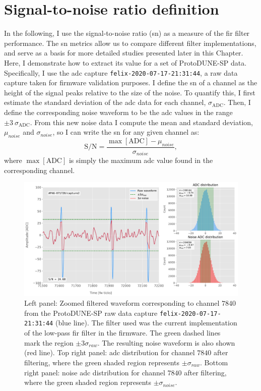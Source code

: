 \section{Signal-to-noise ratio definition}
\label{sec:matched_filter_sn_definition}

In the following, I use the signal-to-noise ratio (\gls{sn}) as a measure of the \gls{fir} filter performance. The \gls{sn} metrics allow us to compare different filter implementations, and serve as a basis for more detailed studies presented later in this Chapter. Here, I demonstrate how to extract its value for a set of ProtoDUNE-SP data. Specifically, I use the \gls{adc} capture \texttt{felix-2020-07-17-21:31:44}, a raw data capture taken for firmware validation purposes. I define the \gls{sn} of a channel as the height of the signal peaks relative to the size of the noise. To quantify this, I first estimate the standard deviation of the \gls{adc} data for each channel, $\sigma_{\mathrm{ADC}}$. Then, I define the corresponding noise waveform to be the \gls{adc} values in the range $\pm 3~\sigma_{\mathrm{ADC}}$. From this new noise data I compute the mean and standard deviation, $\mu_{noise}$ and $\sigma_{noise}$, so I can write the \gls{sn} for any given channel as:
\begin{equation}
	\mathrm{S/N} = \frac{\max{[\mathrm{ADC}]} - \mu_{noise}}{\sigma_{noise}},
\end{equation}
where $\max{[\mathrm{ADC}]}$ is simply the maximum \gls{adc} value found in the corresponding channel.

\begin{figure}[t]
	\centering
	\includegraphics[width=1\linewidth]{Images/Matched_Filter/waveform_example_fir}
	\caption[Example filtered waveform from a ProtoDUNE-SP raw data capture.]{Left panel: Zoomed filtered waveform corresponding to channel $7840$ from the ProtoDUNE-SP raw data capture \texttt{felix-2020-07-17-21:31:44} (blue line). The filter used was the current implementation of the low-pass \gls{fir} filter in the firmware. The green dashed lines mark the region $\pm3\sigma_{raw}$. The resulting noise waveform is also shown (red line). Top right panel: \gls{adc} distribution for channel $7840$ after filtering, where the green shaded region represents $\pm \sigma_{raw}$. Bottom right panel: noise \gls{adc} distribution for channel $7840$ after filtering, where the green shaded region represents $\pm \sigma_{noise}$.}
	\label{fig:adcs_fir}
\end{figure}

